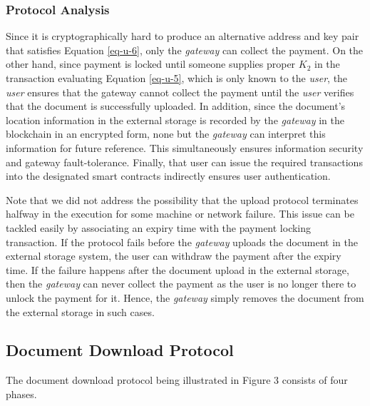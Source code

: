 \subsubsection*{Protocol Analysis}
Since it is cryptographically hard to produce an alternative address and key pair that satisfies Equation \ref{eq-u-6}, only the {\it gateway} can collect the payment. On the other hand, since payment is locked until someone supplies proper $K_2$ in the transaction evaluating Equation \ref{eq-u-5}, which is only known to the {\it user}, the {\it user} ensures that the gateway cannot collect the payment until the {\it user} verifies that the document is successfully uploaded. In addition, since the document's location information in the external storage is recorded by the {\it gateway} in the blockchain in an encrypted form, none but the {\it gateway} can interpret this information for future reference. This simultaneously ensures information security and gateway fault-tolerance. Finally, that user can issue the required transactions into the designated smart contracts indirectly ensures user authentication. 

Note that we did not address the possibility that the upload protocol terminates halfway in the execution for some machine or network failure. This issue can be tackled easily by associating an expiry time with the payment locking transaction. If the protocol fails before the {\it gateway} uploads the document in the external storage system, the user can withdraw the payment after the expiry time. If the failure happens after the document upload in the external storage, then the {\it gateway} can never collect the payment as the user is no longer there to unlock the payment for it. Hence, the {\it gateway} simply removes the document from the external storage in such cases.      

\subsection{Document Download Protocol}
The document download protocol being illustrated in Figure 3 consists of four phases.

